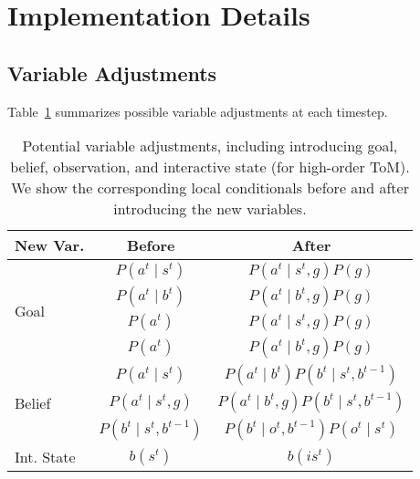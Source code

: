 \section{\ours Implementation Details}
\label{sec:method_details}

\subsection{Variable Adjustments}\label{sec:app_var_adj}

Table~\ref{tab:model_adjustment} summarizes possible variable adjustments at each timestep.

\begin{table}[t!]
\centering
\begin{small}
\begin{tabular}{p{1.2cm}cc}
\toprule
New Var. & Before & After \\
\midrule
\multirow{4}{*}{Goal}
& $P(a^t \mid s^t)$ & $P(a^t \mid s^t, g) P(g)$ \\
& $P(a^t \mid b^t)$ & $P(a^t \mid b^t, g) P(g)$ \\
& $P(a^t)$ & $P(a^t \mid s^t, g) P(g)$ \\
& $P(a^t)$ & $P(a^t \mid b^t, g) P(g)$ \\
\midrule
\multirow{3}{*}{Belief}
& $P(a^t \mid s^t)$ & $P(a^t \mid b^t) P(b^t \mid s^t, b^{t-1})$ \\
& $P(a^t \mid s^t, g)$ & $P(a^t \mid b^t, g) P(b^t \mid s^t, b^{t-1})$ \\
\midrule
\multirow{1}{*}{Observ.}
& $P(b^t \mid s^t, b^{t-1})$ & $P(b^t \mid o^t, b^{t-1}) P(o^t \mid s^t)$ \\
\midrule
\multirow{1}{*}{Int. State}
& $b(s^t)$ & $b(is^t)$ \\
\bottomrule
\end{tabular}
\end{small}

\caption{Potential variable adjustments, including introducing goal, belief, observation, and interactive state (for high-order ToM). We show the corresponding local conditionals before and after introducing the new variables.}
\label{tab:model_adjustment}

\end{table}


